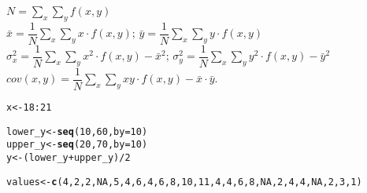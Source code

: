 \documentclass[11pt, a4paper]{article}\usepackage[]{graphicx}\usepackage[]{xcolor}
\makeatletter
\newcommand{\hlnum}[1]{\textcolor[rgb]{0.686,0.059,0.569}{#1}}%
\newcommand{\hlopt}[1]{\textcolor[rgb]{0,0,0}{#1}}%
\newcommand{\hldef}[1]{\textcolor[rgb]{0.345,0.345,0.345}{#1}}%
\newcommand{\hlkwb}[1]{\textcolor[rgb]{0.69,0.353,0.396}{#1}}%
\newcommand{\hlkwc}[1]{\textcolor[rgb]{0.333,0.667,0.333}{#1}}%
\newcommand{\hlkwd}[1]{\textcolor[rgb]{0.737,0.353,0.396}{\textbf{#1}}}%
\newenvironment{kframe}{%
 \def\at@end@of@kframe{}%
 \ifinner\ifhmode%
  \def\at@end@of@kframe{\end{minipage}}%
  \begin{minipage}{\columnwidth}%
 \fi\fi%
 \def\FrameCommand##1{\hskip\@totalleftmargin \hskip-\fboxsep
 \colorbox{shadecolor}{##1}\hskip-\fboxsep
     \hskip-\linewidth \hskip-\@totalleftmargin \hskip\columnwidth}%
 \MakeFramed {\advance\hsize-\width
   \@totalleftmargin\z@ \linewidth\hsize
   \@setminipage}}%
 {\par\unskip\endMakeFramed%
 \at@end@of@kframe}
\newenvironment{knitrout}{}{} %
\makeatother
\begin{document}
$N = \sum \limits_{x} \sum \limits_{y} f(x, y)$ \\

$\bar{x} = \dfrac{1}{N} \sum \limits_{x} \sum \limits_{y} x \cdot f(x, y)$;
\hspace{0.5cm} $\bar{y} = \dfrac{1}{N} \sum \limits_{x} \sum \limits_{y} y \cdot f(x, y)$ \\

$\sigma_x^2 = \dfrac{1}{N} \sum \limits_{x} \sum \limits_{y} x^2 \cdot f(x, y) - \bar{x}^2$; \hspace{0.5cm}
$\sigma_y^2 = \dfrac{1}{N} \sum \limits_{x} \sum \limits_{y} y^2 \cdot f(x, y) - \bar{y}^2$ \\

$cov(x, y) = \dfrac{1}{N} \sum \limits_{x} \sum \limits_{y} xy \cdot f(x, y) - \bar{x} \cdot \bar{y}$.

\begin{knitrout}
\color{fgcolor}\begin{kframe}
\begin{alltt}
\hldef{x} \hlkwb{<-} \hlnum{18}\hlopt{:}\hlnum{21}
\end{alltt}
\end{kframe}
\end{knitrout}

\begin{knitrout}
\color{fgcolor}\begin{kframe}
\begin{alltt}
\hldef{lower_y} \hlkwb{<-} \hlkwd{seq}\hldef{(}\hlnum{10}\hldef{,} \hlnum{60}\hldef{,} \hlkwc{by} \hldef{=} \hlnum{10}\hldef{)}
\hldef{upper_y} \hlkwb{<-} \hlkwd{seq}\hldef{(}\hlnum{20}\hldef{,} \hlnum{70}\hldef{,} \hlkwc{by} \hldef{=} \hlnum{10}\hldef{)}
\hldef{y} \hlkwb{<-} \hldef{(lower_y} \hlopt{+} \hldef{upper_y)} \hlopt{/} \hlnum{2}
\end{alltt}
\end{kframe}
\end{knitrout}

\begin{knitrout}\footnotesize
{}\color{fgcolor}\begin{kframe}
\begin{alltt}
\hldef{values} \hlkwb{<-} \hlkwd{c}\hldef{(}\hlnum{4}\hldef{,} \hlnum{2}\hldef{,} \hlnum{2}\hldef{,} \hlnum{NA}\hldef{,} \hlnum{5}\hldef{,} \hlnum{4}\hldef{,} \hlnum{6}\hldef{,} \hlnum{4}\hldef{,} \hlnum{6}\hldef{,} \hlnum{8}\hldef{,} \hlnum{10}\hldef{,} \hlnum{11}\hldef{,} \hlnum{4}\hldef{,} \hlnum{4}\hldef{,} \hlnum{6}\hldef{,} \hlnum{8}\hldef{,} \hlnum{NA}\hldef{,} \hlnum{2}\hldef{,} \hlnum{4}\hldef{,} \hlnum{4}\hldef{,} \hlnum{NA}\hldef{,} \hlnum{2}\hldef{,} \hlnum{3}\hldef{,} \hlnum{1}\hldef{)}
\end{alltt}
\end{kframe}
\end{knitrout}
\end{document}
